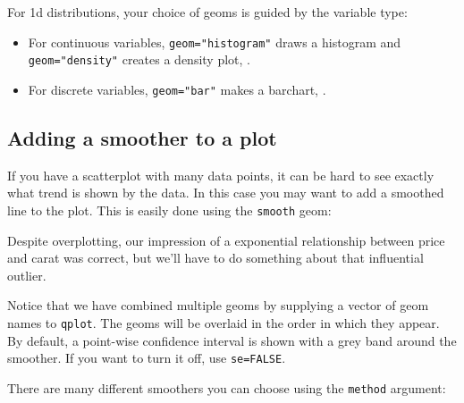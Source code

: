 For 1d distributions, your choice of geoms is guided by the variable type:

\begin{itemize}
  \item For continuous variables, {\tt geom="histogram"} draws a histogram and {\tt geom="density"} creates a density plot, .

  \item For discrete variables, {\tt geom="bar"} makes a barchart, .

\end{itemize}



\subsection{Adding a smoother to a plot}\label{sub:smooth}

If you have a scatterplot with many data points, it can be hard to see exactly what trend is shown by the data.  In this case you may want to add a smoothed line to the plot.  This is easily done using the {\tt smooth} geom:

% 


Despite overplotting, our impression of a exponential relationship between price and carat was correct, but we'll have to do something about that influential outlier.  

Notice that we have combined multiple geoms by supplying a vector of geom names to {\tt qplot}.  The geoms will be overlaid in the order in which they appear.  By default, a point-wise confidence interval is shown with a grey band around the smoother.  If you want to turn it off, use {\tt se=FALSE}.

There are many different smoothers you can choose using the {\tt method} argument:

